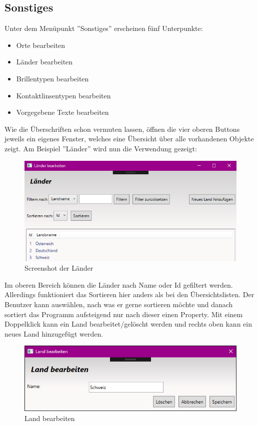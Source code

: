 \subsection{Sonstiges}
Unter dem Menüpunkt ''Sonstiges'' erscheinen fünf Unterpunkte:
\begin{itemize}
\item Orte bearbeiten
\item Länder bearbeiten
\item Brillentypen bearbeiten
\item Kontaktlinsentypen bearbeiten
\item Vorgegebene Texte bearbeiten
\end{itemize}
Wie die Überschriften schon vermuten lassen, öffnen die vier oberen Buttons jeweils ein eigenes Fenster, welches eine Übersicht über alle vorhandenen Objekte zeigt. Am Beispiel ''Länder'' wird nun die Verwendung gezeigt:
\begin{figure}[H]
\begin{center}
	\includegraphics[scale=0.75]{images/Laender.png}
\end{center}
	\caption{Screenshot der L\"ander}
	\label{fig:sample}
\end{figure} 
\noindent Im oberen Bereich können die Länder nach Name oder Id gefiltert werden. Allerdings funktioniert das Sortieren hier anders als bei den Übersichtslisten. Der Benutzer kann auswählen, nach was er gerne sortieren möchte und danach sortiert das Programm aufsteigend nur nach dieser einen Property. Mit einem Doppelklick kann ein Land bearbeitet/gelöscht werden und rechts oben kann ein neues Land hinzugefügt werden.
\begin{figure}[H]
\begin{center}
	\includegraphics[scale=0.65]{images/LandBearbeiten.png}
\end{center}
	\caption{Land bearbeiten}
	\label{fig:sample}
\end{figure} 
